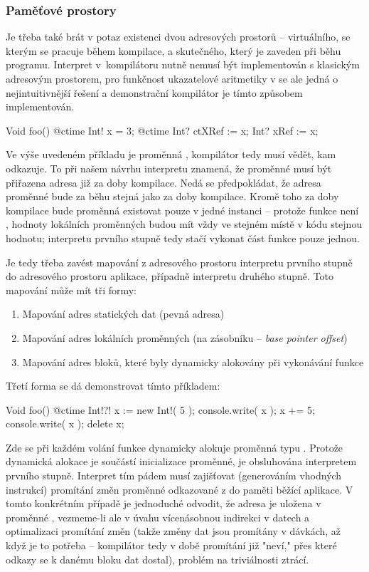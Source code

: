 \subsubsection{Paměťové prostory}
Je třeba také brát v potaz existenci dvou adresových prostorů -- virtuálního, se kterým se pracuje během kompilace, a skutečného, který je zaveden při běhu programu. Interpret v~kompilátoru nutně nemusí být implementován s klasickým adresovým prostorem, pro funkčnost ukazatelové aritmetiky v \ctime se ale jedná o nejintuitivnější řešení a demonstrační kompilátor je tímto způsobem implementován.

\begin{code}
Void foo() {
	@ctime Int! x = 3;
	@ctime Int? ctXRef := x;
	Int? xRef := x;
}
\end{code}

Ve výše uvedeném příkladu je proměnná  \ctime, kompilátor tedy musí vědět, kam odkazuje. To při našem návrhu interpretu znamená, že proměnné  musí být přiřazena adresa již za doby kompilace. Nedá se předpokládat, že adresa proměnné  bude za běhu stejná jako za doby kompilace. Kromě toho za doby kompilace bude proměnná  existovat pouze v jedné instanci -- protože funkce  není \ctime, hodnoty lokálních \ctime proměnných budou mít vždy ve stejném místě v kódu stejnou hodnotu; interpretu prvního stupně tedy stačí vykonat \ctime část funkce pouze jednou.

Je tedy třeba zavést mapování z adresového prostoru interpretu prvního stupně do adresového prostoru aplikace, případně interpretu druhého stupně. Toto mapování může mít tři formy:
\begin{enumerate}
	\item Mapování adres statických dat (pevná adresa)
	\item Mapování adres lokálních proměnných (na zásobníku -- \textit{base pointer offset})
	\item Mapování adres \ctime bloků, které byly dynamicky alokovány při vykonávání \nonctime funkce
\end{enumerate}

Třetí forma se dá demonstrovat tímto příkladem:
\begin{code}
Void foo() {
	@ctime Int!?! x := new Int!( 5 );
	console.write( x );
	x += 5;
	console.write( x );
	delete x;
}
\end{code}

Zde se při každém volání funkce  dynamicky alokuje proměnná typu . Protože dynamická alokace je součástí inicializace \ctime proměnné, je obsluhována interpretem prvního stupně. Interpret tím pádem musí zajišťovat (generováním vhodných instrukcí) promítání změn proměnné odkazované z  do paměti běžící aplikace. V tomto konkrétním případě je jednoduché odvodit, že adresa je uložena v proměnné , vezmeme-li ale v úvahu vícenásobnou indirekci v \ctime datech a optimalizaci promítání změn (takže změny dat jsou promítány v dávkách, až když je to potřeba -- kompilátor tedy v době promítání již "neví," přes které odkazy se k danému bloku dat dostal), problém na triviálnosti ztrácí.

